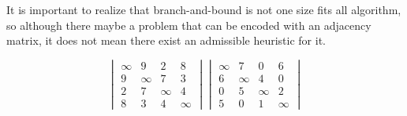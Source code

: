    It is important to realize that branch-and-bound is not one size fits all algorithm, so
    although there maybe a problem that can be encoded with an adjacency matrix, it does not mean
    there exist an admissible heuristic for it. 

   \begin{equation}
	    \begin{vmatrix}
	        \infty & 9 & 2 & 8\\
	        9 & \infty & 7 & 3 \\
	        2 & 7 & \infty & 4 \\
	        8 & 3 & 4 & \infty
	    \end{vmatrix}
	    \begin{vmatrix}
	        \infty & 7 & 0 & 6\\
	        6 & \infty & 4 & 0 \\
	        0 & 5 & \infty & 2 \\
	        5 & 0 & 1 & \infty
	    \end{vmatrix}
	\end{equation}
